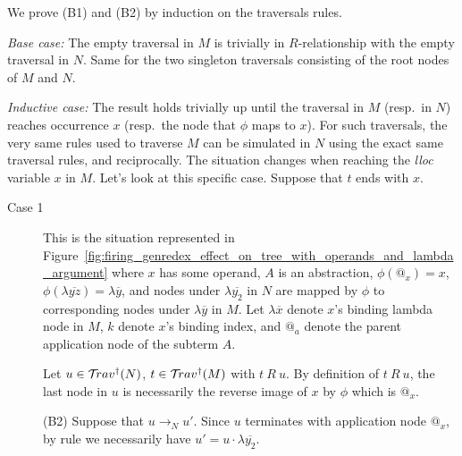 \documentclass{article}
\theoremstyle{definition}
\begin{document}
We prove (B1) and (B2) by induction on the traversals rules.

\emph{Base case:} The empty traversal in $M$ is trivially in $R$-relationship with the empty traversal in $N$. Same for the two singleton traversals consisting of the root nodes of $M$ and $N$.

\emph{Inductive case:}
The result holds trivially up until the traversal in $M$ (resp.~in $N$) reaches  occurrence $x$ (resp.~the node that $\phi$ maps to $x$). For such traversals, the very same rules used to traverse $M$ can be simulated in $N$ using the exact same traversal rules, and reciprocally. The situation changes when reaching the \emph{lloc} variable $x$ in $M$. Let's look at this specific case.
Suppose that $t$ ends with $x$.
\begin{description}
\item[Case 1] This is the situation represented in Figure~\ref{fig:firing_genredex_effect_on_tree_with_operands_and_lambda_argument} where $x$ has some operand, $A$ is an abstraction, $\phi(@_x) = x$, $\phi(\lambda\overline{yz}) = \lambda\overline{y}$, and nodes under
$\lambda\overline{y_2}$ in $N$ are mapped by $\phi$ to corresponding nodes under $\lambda\overline{y}$ in $M$. Let $\lambda\overline{x}$ denote $x$'s binding lambda node in $M$, $k$ denote $x$'s binding index, and $@_a$ denote the parent application node of the subterm $A$.

Let $u\in \mathcal{T}\!rav^\dagger(N)$, $t\in\mathcal{T}\!rav^\dagger(M)$ with $t~R~u$.
By definition of $t~R~u$, the last node in $u$ is necessarily the reverse image of $x$ by $\phi$ which is $@_x$.

(B2) Suppose that $u \rightarrow_N u'$. Since $u$ terminates with application node $@_x$, by rule  we necessarily have $u' = u \cdot \lambda\overline{y_2}$.


\end{description}
\end{document}
